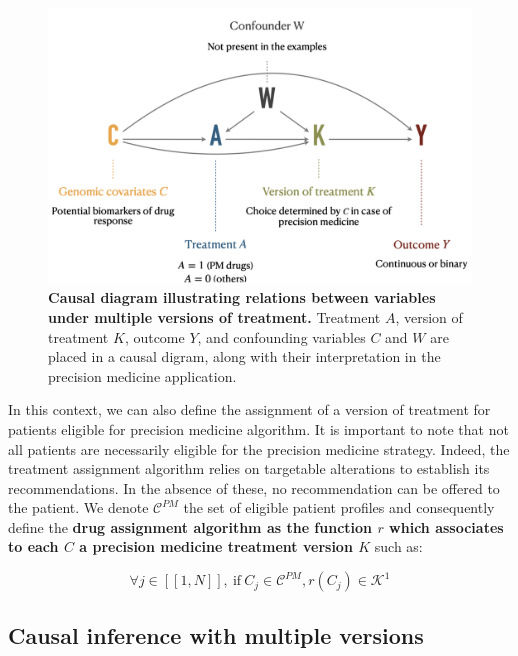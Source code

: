 \documentclass[a4paper,12pt,twoside,onecolumn,openright,final,oldfontcommands]{memoir}
\begin{document}
\begin{figure}

{\centering \includegraphics[width=0.9\linewidth]{fig/DAG-multiple} 

}

\caption[Causal diagram illustrating relations between variables under multiple versions of treatment]{\textbf{Causal diagram illustrating relations
between variables under multiple versions of treatment.} Treatment
\(A\), version of treatment \(K\), outcome \(Y\), and confounding
variables \(C\) and \(W\) are placed in a causal digram, along with
their interpretation in the precision medicine application.}\label{fig:DAG-multiple}
\end{figure}







In this context, we can also define the assignment of a version of
treatment for patients eligible for precision medicine algorithm. It is
important to note that not all patients are necessarily eligible for the
precision medicine strategy. Indeed, the treatment assignment algorithm
relies on targetable alterations to establish its recommendations. In
the absence of these, no recommendation can be offered to the patient.
We denote \(\mathcal{C}^{PM}\) the set of eligible patient profiles and
consequently define the \textbf{drug assignment algorithm as the
function \(r\) which associates to each \(C\) a precision medicine
treatment version \(K\)} such as:

\[\forall j \in [[ 1, N ]], \: \textrm{if} \: C_j \in \mathcal{C}^{PM}, r(C_j) \in \mathcal{K}^{1}\]

\subsection{Causal inference with multiple
versions}\label{causal-inference-with-multiple-versions}
\end{document}
